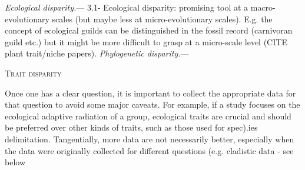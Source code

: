 \documentclass[12pt,letterpaper]{article}
\renewcommand{\section}[1]{%
\bigskip
\begin{center}
\begin{Large}
\normalfont\scshape #1
\medskip
\end{Large}
\end{center}}
\renewcommand{\subsubsection}[1]{%
\vspace{2ex}
\noindent
\textit{#1.}---}
\begin{document}
\subsubsection{Ecological disparity}
3.1- Ecological disparity: promising tool at a macro-evolutionary scales (but maybe less at micro-evolutionary scales). E.g. the concept of ecological guilds can be distinguished in the fossil record (carnivoran guild etc.) but it might be more difficult to grasp at a micro-scale level (CITE plant trait/niche papers).
\subsubsection{Phylogenetic disparity}




\section{Trait disparity}
Once one has a clear question, it is important to collect the appropriate data for that question to avoid some major caveats.
For example, if a study focuses on the ecological adaptive radiation of a group, ecological traits are crucial and should be preferred over other kinds of traits, such as those used for spec).ies delimitation.
Tangentially, more data are not necessarily better, especially when the data were originally collected for different questions (e.g. cladistic data - see below
\end{document}
